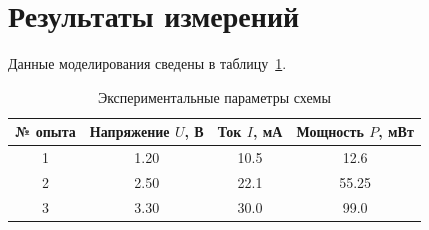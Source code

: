 \begin{center}
\end{center}

\begin{center}
\end{center}

\section{Результаты измерений}
Данные моделирования сведены в таблицу~\ref{tab:results}.

\begin{table}[h!]
    \caption{Экспериментальные параметры схемы}
    \label{tab:results}
    \centering
    \begin{tabular}{|c|c|c|c|}
        \hline
        \textbf{№ опыта} & \textbf{Напряжение $U$, В} & \textbf{Ток $I$, мА} & \textbf{Мощность $P$, мВт} \\ \hline
        1 & 1.20 & 10.5 & 12.6 \\ \hline
        2 & 2.50 & 22.1 & 55.25 \\ \hline
        3 & 3.30 & 30.0 & 99.0 \\ \hline
    \end{tabular}
\end{table}
